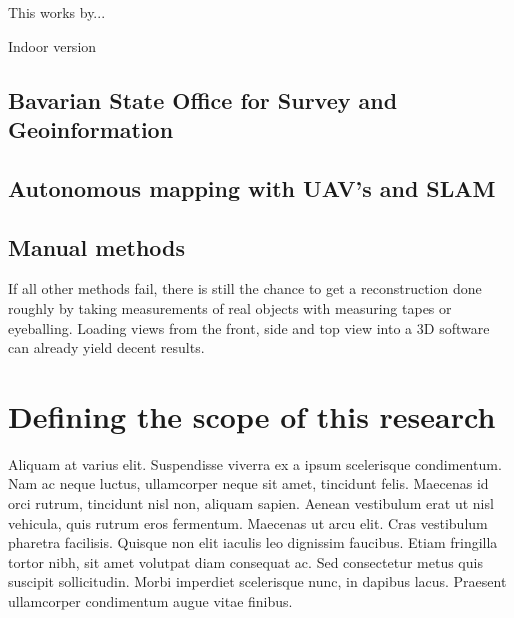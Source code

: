 This works by...

Indoor version

\subsection{Bavarian State Office for Survey and Geoinformation}



\subsection{Autonomous mapping with UAV's and SLAM}



\subsection{Manual methods}

If all other methods fail, there is still the chance to get a reconstruction done roughly by taking measurements of real objects with measuring tapes or eyeballing. Loading views from the front, side and top view into a 3D software can already yield decent results.

\section{Defining the scope of this research}

Aliquam at varius elit. Suspendisse viverra ex a ipsum scelerisque condimentum. Nam ac neque luctus, ullamcorper neque sit amet, tincidunt felis. Maecenas id orci rutrum, tincidunt nisl non, aliquam sapien. Aenean vestibulum erat ut nisl vehicula, quis rutrum eros fermentum. Maecenas ut arcu elit. Cras vestibulum pharetra facilisis. Quisque non elit iaculis leo dignissim faucibus. Etiam fringilla tortor nibh, sit amet volutpat diam consequat ac. Sed consectetur metus quis suscipit sollicitudin. Morbi imperdiet scelerisque nunc, in dapibus lacus. Praesent ullamcorper condimentum augue vitae finibus. 